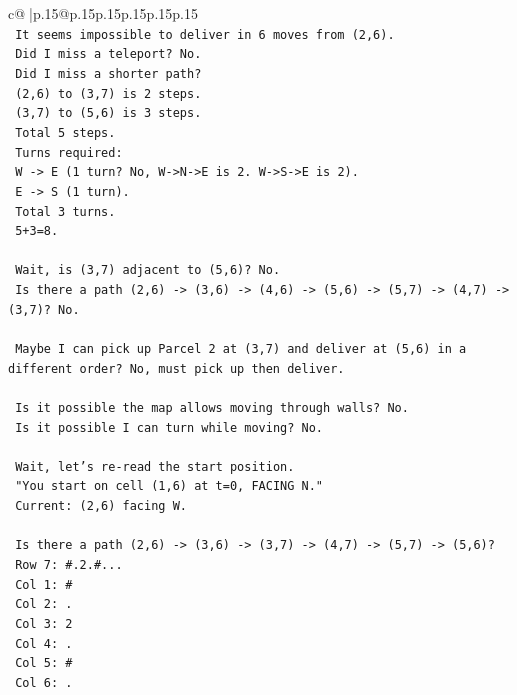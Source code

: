 \documentclass{article}
\begin{document}
{\begin{supertabular}{c@{$\;$}|p{.15\linewidth}@{}p{.15\linewidth}p{.15\linewidth}p{.15\linewidth}p{.15\linewidth}p{.15\linewidth}}
{{{\\ 
\texttt{   It seems impossible to deliver in 6 moves from (2,6).} \\
\texttt{   Did I miss a teleport? No.} \\
\texttt{   Did I miss a shorter path?} \\
\texttt{   (2,6) to (3,7) is 2 steps.} \\
\texttt{   (3,7) to (5,6) is 3 steps.} \\
\texttt{   Total 5 steps.} \\
\texttt{   Turns required:} \\
\texttt{   W {-}> E (1 turn? No, W{-}>N{-}>E is 2. W{-}>S{-}>E is 2).} \\
\texttt{   E {-}> S (1 turn).} \\
\texttt{   Total 3 turns.} \\
\texttt{   5+3=8.} \\
\\ 
\texttt{   Wait, is (3,7) adjacent to (5,6)? No.} \\
\texttt{   Is there a path (2,6) {-}> (3,6) {-}> (4,6) {-}> (5,6) {-}> (5,7) {-}> (4,7) {-}> (3,7)? No.} \\
\\ 
\texttt{   Maybe I can pick up Parcel 2 at (3,7) and deliver at (5,6) in a different order? No, must pick up then deliver.} \\
\\ 
\texttt{   Is it possible the map allows moving through walls? No.} \\
\texttt{   Is it possible I can turn while moving? No.} \\
\\ 
\texttt{   Wait, let's re{-}read the start position.} \\
\texttt{   "You start on cell (1,6) at t=0, FACING N."} \\
\texttt{   Current: (2,6) facing W.} \\
\\ 
\texttt{   Is there a path (2,6) {-}> (3,6) {-}> (3,7) {-}> (4,7) {-}> (5,7) {-}> (5,6)?} \\
\texttt{   Row 7: \#.2.\#...} \\
\texttt{   Col 1: \#} \\
\texttt{   Col 2: .} \\
\texttt{   Col 3: 2} \\
\texttt{   Col 4: .} \\
\texttt{   Col 5: \#} \\
\texttt{   Col 6: .} \\
}}}
\end{supertabular}}
\end{document}
